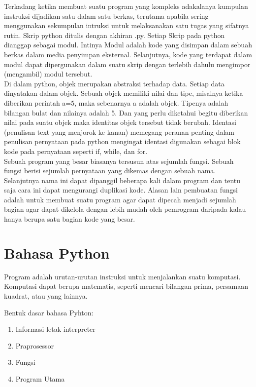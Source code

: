 \documentclass[12pt,a4paper]{article}
\begin{document}
Terkadang ketika membuat suatu program yang kompleks adakalanya kumpulan instruksi dijadikan satu dalam satu berkas, terutama apabila sering menggunakan sekumpulan intruksi untuk melaksanakan satu tugas yang sifatnya rutin. Skrip python ditulis dengan akhiran .py. Setiap Skrip pada python dianggap sebagai modul. Intinya Modul adalah kode yang disimpan dalam sebuah berkas dalam media penyimpan eksternal. Selanjutnya, kode yang terdapat dalam modul dapat dipergunakan dalam suatu skrip dengan terlebih dahulu mengimpor (mengambil) modul tersebut.\\

Di dalam python, objek merupakan abstraksi terhadap data. Setiap data dinyatakan dalam objek. Sebuah objek memiliki nilai dan tipe, misalnya ketika diberikan perintah a=5, maka sebenarnya a adalah objek. Tipenya adalah bilangan bulat dan nilainya adalah 5. Dan yang perlu diketahui begitu diberikan nilai pada suatu objek maka identitas objek tersebut tidak berubah. Identasi (penulisan text yang menjorok ke kanan) memegang peranan penting dalam penulisan pernyataan pada python mengingat identasi digunakan sebagai blok kode pada pernyataan seperti if, while, dan for.\\

Sebuah program yang besar biasanya tersusun atas sejumlah fungsi. Sebuah fungsi berisi sejumlah pernyataan yang dikemas dengan sebuah nama. Selanjutnya nama ini dapat dipanggil beberapa kali dalam program dan tentu saja cara ini dapat mengurangi duplikasi kode. Alasan lain pembuatan fungsi adalah untuk membuat suatu program agar
dapat dipecah menjadi sejumlah bagian agar dapat dikelola dengan lebih mudah oleh pemrogram daripada kalau hanya berupa satu bagian kode yang besar.

\section{Bahasa Python}
Program adalah urutan-urutan instruksi untuk menjalankan suatu komputasi. Komputasi dapat berupa matematis, seperti mencari bilangan prima, persamaan kuadrat, atau yang lainnya.

Bentuk dasar bahasa Pyhton:
\begin{enumerate}
\item Informasi letak interpreter
\item Praprosessor
\item Fungsi
\item Program Utama
\end{enumerate}
\end{document}
